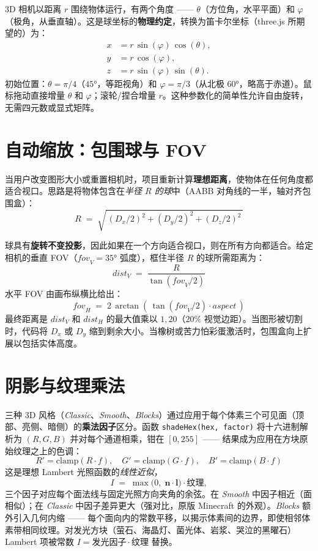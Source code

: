 \documentclass[12pt,a4paper]{scrartcl}
\newcommand{\code}[1]{\texttt{\small #1}}
\newcommand{\acc}[1]{\textcolor{accent}{\textbf{#1}}}
\begin{document}
3D 相机以距离 $r$ 围绕物体运行，有两个角度 —— $\theta$（方位角，水平平面）和 $\varphi$（极角，从垂直轴）。这是球坐标的\acc{物理约定}，转换为笛卡尔坐标（three.js 所期望的）为：
\[
\begin{aligned}
x &= r\,\sin(\varphi)\,\cos(\theta), \\
y &= r\,\cos(\varphi), \\
z &= r\,\sin(\varphi)\,\sin(\theta).
\end{aligned}
\]
初始位置：$\theta = \pi/4$（$45°$，等距视角）和 $\varphi = \pi/3$（从北极 $60°$，略高于赤道）。鼠标拖动直接增量 $\theta$ 和 $\varphi$；滚轮/捏合增量 $r$。这种参数化的简单性允许自由旋转，无需四元数或显式矩阵。

\section{自动缩放：包围球与 FOV}

当用户改变图形大小或重置相机时，项目重新计算\acc{理想距离}，使物体在任何角度都适合视口。思路是将物体包含在\emph{半径 $R$ 的球}中（AABB 对角线的一半，轴对齐包围盒）：
\[
R \;=\; \sqrt{\,(D_x/2)^2 + (D_y/2)^2 + (D_z/2)^2\,}
\]

球具有\acc{旋转不变投影}，因此如果在一个方向适合视口，则在所有方向都适合。给定相机的垂直 FOV（$\mathit{fov}_V = 35°$ 弧度），框住半径 $R$ 的球所需距离为：
\[
\mathit{dist}_V \;=\; \dfrac{R}{\tan(\mathit{fov}_V / 2)}
\]
水平 FOV 由画布纵横比给出：
\[
\mathit{fov}_H \;=\; 2\,\arctan\!\left(\,\tan(\mathit{fov}_V/2)\cdot \mathit{aspect}\,\right)
\]
最终距离是 $\mathit{dist}_V$ 和 $\mathit{dist}_H$ 的最大值乘以 $1{,}20$（$20\%$ 视觉边距）。当图形被切割时，代码将 $D_x$ 或 $D_y$ 缩到剩余大小。当橡树或苦力怕彩蛋激活时，包围盒向上扩展以包括实体高度。

\section{阴影与纹理乘法}

三种 3D 风格（\emph{Classic}、\emph{Smooth}、\emph{Blocks}）通过应用于每个体素三个可见面（顶部、亮侧、暗侧）的\acc{乘法因子}区分。函数 \code{shadeHex(hex, factor)} 将十六进制解析为 $(R,G,B)$ 并对每个通道相乘，钳在 $[0, 255]$ —— 结果成为应用在方块原始纹理之上的色调：
\[
R' = \mathrm{clamp}(R \cdot f),\quad
G' = \mathrm{clamp}(G \cdot f),\quad
B' = \mathrm{clamp}(B \cdot f)
\]
这是理想 Lambert 光照函数的\emph{线性近似}，
\[
I \;=\; \max\bigl(0,\;\mathbf{n}\cdot\mathbf{l}\bigr)\cdot \mathit{纹理},
\]
三个因子对应每个面法线与固定光照方向夹角的余弦。在 \emph{Smooth} 中因子相近（面相似）；在 \emph{Classic} 中因子差异更大（强对比，原版 Minecraft 的外观）。\emph{Blocks} 额外引入几何内缩 —— 每个面向内的常数平移，以揭示体素间的边界，即使相邻体素带相同纹理。对发光方块（萤石、海晶灯、菌光体、岩浆、哭泣的黑曜石）Lambert 项被常数 $I = \mathit{发光因子} \cdot \mathit{纹理}$ 替换。
\end{document}
